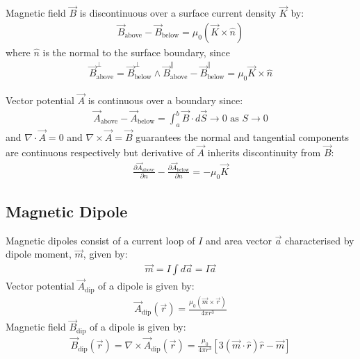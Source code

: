 \documentclass[12pt, a4paper]{article}
\begin{document}
\begin{multicols*}{3}
Magnetic field $\vec{B}$ is discontinuous over a surface current density $\vec{K}$ by:
\begin{align*}
  \vec{B}_{\text{above}} - \vec{B}_{\text{below}} = \mu_0(\vec{K} \times \hat{n})
\end{align*}
where $\hat{n}$ is the normal to the surface boundary, since
\begin{align*}
    \vec{B}^{\perp}_{\text{above}} = \vec{B}^{\perp}_{\text{below}} \land 
    \vec{B}^{\parallel}_{\text{above}} - \vec{B}^{\parallel}_{\text{below}} 
    = \mu_0 \vec{K} \times \hat{n}
\end{align*}

Vector potential $\vec{A}$ is continuous over a boundary since:
\begin{align*}
  \vec{A}_{\text{above}} - \vec{A}_{\text{below}} 
  = \int^b_a \vec{B}\cdot d \vec{S} \rightarrow 0 \text{ as } S \rightarrow 0
\end{align*}
and $\nabla \cdot \vec{A} = 0$ and $\nabla \times \vec{A} = \vec{B}$ guarantees the normal and tangential components are continuous respectively but derivative of $\vec{A}$ inherits discontinuity from $\vec{B}$:
\begin{align*}
  \frac{\partial \vec{A}_{\text{above}}}{\partial n} - \frac{\partial \vec{A}_{\text{below}}}{\partial n} = -\mu_0 \vec{K}
\end{align*}
\colbreak

\subsection{Magnetic Dipole}
Magnetic dipoles consist of a current loop of $I$ and area vector $\vec{a}$ characterised by dipole moment, $\vec{m}$, given by:
\begin{align*}
  \vec{m} = I\int d \vec{a} = I \vec{a}
\end{align*}
Vector potential $\vec{A}_{\text{dip}}$ of a dipole is given by:
\begin{align*}
  \vec{A}_{\text{dip}}(\vec r) = \frac{\mu_0(\vec{m}\times \vec{r})}{4\pi r^3}
\end{align*}
Magnetic field $\vec{B}_{\text{dip}}$ of a dipole is given by:
\begin{align*}
  \vec{B}_{\text{dip}}(\vec r) = \nabla \times \vec{A}_{\text{dip}}(\vec r)
  = \frac{\mu_0}{4\pi r^3}[3(\vec m\!\cdot\!\hat r)\hat r - \vec m]
\end{align*}


\end{multicols*}
\end{document}
